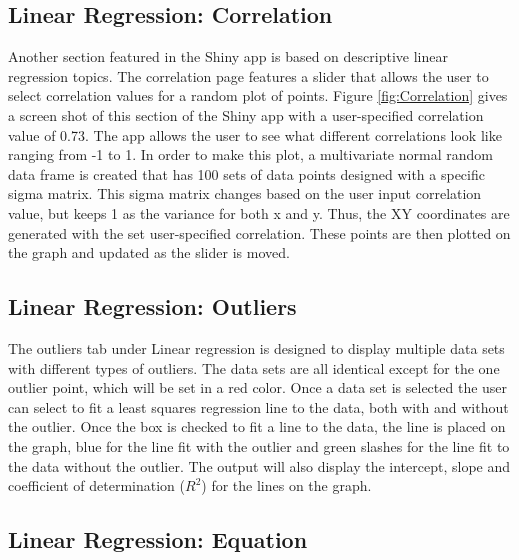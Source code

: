 \documentclass[11pt]{book}
\begin{document}
\subsection{Linear Regression: Correlation}
Another section featured in the Shiny app is based on descriptive linear regression topics. The correlation page features a slider that allows the user to select correlation values for a random plot of points. Figure \ref{fig:Correlation} gives a screen shot of this section of the Shiny app with a user-specified correlation value of 0.73. The app allows the user to see what different correlations look like ranging from -1 to 1. In order to make this plot, a multivariate normal random data frame is created that has 100 sets of data points designed with a specific sigma matrix.  This sigma matrix changes based on the user input correlation value, but keeps 1 as the variance for both x and y.  Thus, the XY coordinates are generated with the set user-specified correlation. These points are then plotted on the graph and updated as the slider is moved. 

\subsection{Linear Regression: Outliers}
 
The outliers tab under Linear regression is designed to display multiple data sets with different types of outliers. The data sets are all identical except for the one outlier point, which will be set in a red color.  Once a data set is selected the user can select to fit a least squares regression line to the data, both with and without the outlier. Once the box is checked to fit a line to the data, the line is placed on the graph, blue for the line fit with the outlier and green slashes for the line fit to the data without the outlier. The output will also display the intercept, slope and coefficient of determination ($R^2$) for the lines on the graph.  
 
\subsection{Linear Regression: Equation}
\end{document}
